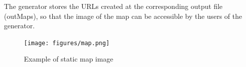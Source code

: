 The generator stores the URLs created at the corresponding output file (outMaps), so that the image of the map can be accessible by the users of the generator.

\begin{figure}[H]
  \centering
  \texttt{[image: figures/map.png]}
  \caption{Example of static map image}
\end{figure}









